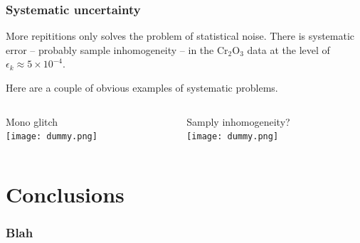 \documentclass[10pt, xcolor=x11names, compress]{beamer}
\begin{document}
\begin{frame}
  \frametitle{Systematic uncertainty}
  More repititions only solves the problem of statistical noise.
  There is systematic error -- probably sample inhomogeneity -- in the
  Cr$_2$O$_3$ data at the level of $\epsilon_k \approx 5\times
  10^{-4}$.

  \bigskip

  Here are a couple of obvious examples of systematic problems.

  \begin{columns}[T]
    \begin{column}{0.5\linewidth}
      \centering Mono glitch\\
      \texttt{[image: dummy.png]}      
    \end{column}
    \begin{column}{0.5\linewidth}
      \centering Samply inhomogeneity?\\
      \texttt{[image: dummy.png]}      
    \end{column}
  \end{columns}

\end{frame}

\section{Conclusions}

\begin{frame}
  \frametitle{Blah}
  
\end{frame}
\end{document}
